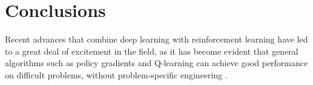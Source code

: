\chapter{Conclusions}
\label{chp:conclusions}


\lipsum[1]



Recent advances that combine deep learning with reinforcement learning have led to a great deal of excitement in the field, as it has become evident that general algorithms such as policy gradients and Q-learning can achieve good performance on difficult problems, without problem-specific engineering \cite{mnih2015human,mnih2016asynchronous}.